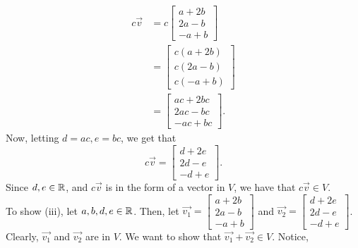         \begin{align*}
            c\vec{v} & = c 
                \begin{bmatrix}
                    a+2b \\
                    2a-b \\
                    -a+b
            \end{bmatrix} \\
        & = \begin{bmatrix}
                c(a+2b) \\
                c(2a-b) \\
                c(-a+b)
            \end{bmatrix} \\
        & = \begin{bmatrix}
                ac+2bc \\
                2ac-bc \\
                -ac+bc
            \end{bmatrix}.
        \end{align*}
    Now, letting $d=ac,e=bc$, we get that
    \begin{equation*}
        c\vec{v} = \begin{bmatrix}
                        d+2e \\
                        2d-e \\
                        -d+e
                    \end{bmatrix}.
    \end{equation*}
    Since $d,e \in \mathbb{R}$, and $c\vec{v}$ is in the form of a vector in $V$, we have that $c\vec{v} \in V$. \\
    To show (iii), let $a,b,d,e \in \mathbb{R}$. Then, let $\vec{v_1} =                \begin{bmatrix}
            a+2b \\
            2a-b \\
            -a+b
        \end{bmatrix}$
    and $\vec{v_2} = 
        \begin{bmatrix}
            d+2e \\
            2d-e \\
            -d+e
        \end{bmatrix}$.
    Clearly, $\vec{v_1}$ and $\vec{v_2}$ are in $V$. We want to show that $\vec{v_1} + \vec{v_2} \in V$. Notice,

